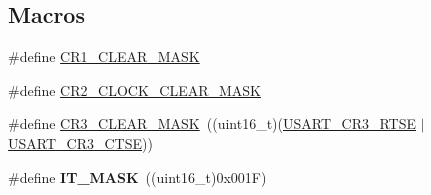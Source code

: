 \subsection*{Macros}
\begin{DoxyCompactItemize}
\item 
\#define \hyperlink{group___u_s_a_r_t_ga8d425258898b4af4ebc820f52635fad8}{C\+R1\+\_\+\+C\+L\+E\+A\+R\+\_\+\+M\+A\+SK}
\item 
\#define \hyperlink{group___u_s_a_r_t_ga7834b3d9be4875de242f87c12fd79f02}{C\+R2\+\_\+\+C\+L\+O\+C\+K\+\_\+\+C\+L\+E\+A\+R\+\_\+\+M\+A\+SK}
\item 
\#define \hyperlink{group___u_s_a_r_t_ga5c882571db73abc5d1837368a1cb0a64}{C\+R3\+\_\+\+C\+L\+E\+A\+R\+\_\+\+M\+A\+SK}~((uint16\+\_\+t)(\hyperlink{group___peripheral___registers___bits___definition_ga7c5d6fcd84a4728cda578a0339b4cac2}{U\+S\+A\+R\+T\+\_\+\+C\+R3\+\_\+\+R\+T\+SE} $\vert$ \hyperlink{group___peripheral___registers___bits___definition_gaa125f026b1ca2d76eab48b191baed265}{U\+S\+A\+R\+T\+\_\+\+C\+R3\+\_\+\+C\+T\+SE}))
\item 
\mbox{\label{group___u_s_a_r_t_gacde7fc0e46b3a5fc7e2002b2915884d5}} 
\#define {\bfseries I\+T\+\_\+\+M\+A\+SK}~((uint16\+\_\+t)0x001\+F)
\end{DoxyCompactItemize}
